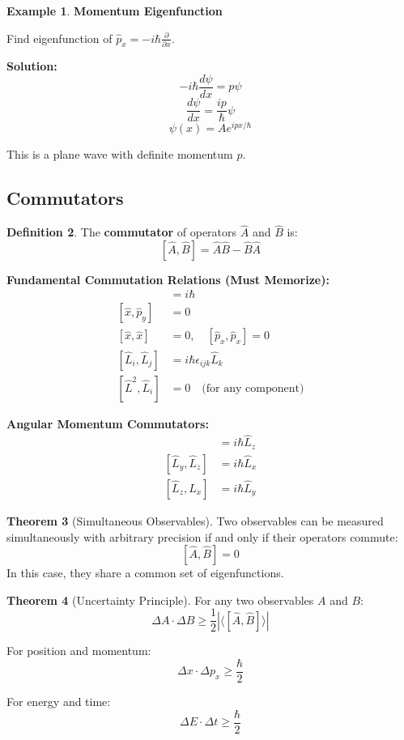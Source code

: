 \documentclass[12pt,a4paper]{article}
\theoremstyle{definition}
\newtheorem{theorem}{Theorem}[section]
\newtheorem{definition}[theorem]{Definition}
\newtheorem{example}[theorem]{Example}
\begin{document}
\begin{example}
\textbf{Momentum Eigenfunction}

Find eigenfunction of $\hat{p}_x = -i\hbar\frac{\partial}{\partial x}$.

\textbf{Solution:}
\[
-i\hbar\frac{d\psi}{dx} = p\psi
\]
\[
\frac{d\psi}{dx} = \frac{ip}{\hbar}\psi
\]
\[
\psi(x) = Ae^{ipx/\hbar}
\]

This is a plane wave with definite momentum $p$.
\end{example}

\subsection{Commutators}

\begin{definition}
The \textbf{commutator} of operators $\hat{A}$ and $\hat{B}$ is:
\[
[\hat{A}, \hat{B}] = \hat{A}\hat{B} - \hat{B}\hat{A}
\]
\end{definition}

\begin{importantbox}
\textbf{Fundamental Commutation Relations (Must Memorize):}
\begin{align}
[\hat{x}, \hat{p}_x] &= i\hbar \\
[\hat{x}, \hat{p}_y] &= 0 \\
[\hat{x}, \hat{x}] &= 0, \quad [\hat{p}_x, \hat{p}_x] = 0 \\
[\hat{L}_i, \hat{L}_j] &= i\hbar\epsilon_{ijk}\hat{L}_k \\
[\hat{L}^2, \hat{L}_i] &= 0 \quad \text{(for any component)}
\end{align}

\textbf{Angular Momentum Commutators:}
\begin{align}
[\hat{L}_x, \hat{L}_y] &= i\hbar\hat{L}_z \\
[\hat{L}_y, \hat{L}_z] &= i\hbar\hat{L}_x \\
[\hat{L}_z, \hat{L}_x] &= i\hbar\hat{L}_y
\end{align}
\end{importantbox}

\begin{theorem}[Simultaneous Observables]
Two observables can be measured simultaneously with arbitrary precision if and only if their operators commute:
\[
[\hat{A}, \hat{B}] = 0
\]
In this case, they share a common set of eigenfunctions.
\end{theorem}

\begin{theorem}[Uncertainty Principle]
For any two observables $A$ and $B$:
\[
\Delta A \cdot \Delta B \geq \frac{1}{2}|\langle[\hat{A}, \hat{B}]\rangle|
\]

For position and momentum:
\[
\Delta x \cdot \Delta p_x \geq \frac{\hbar}{2}
\]

For energy and time:
\[
\Delta E \cdot \Delta t \geq \frac{\hbar}{2}
\]
\end{theorem}
\end{document}
